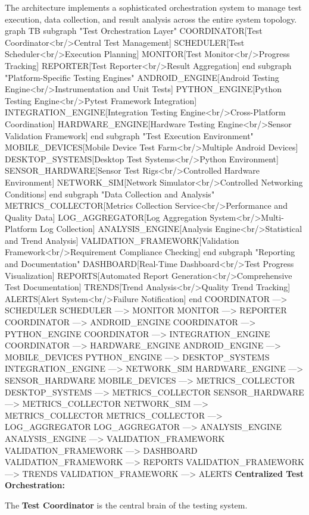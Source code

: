 {{{The architecture implements a sophisticated orchestration system to manage test execution, data collection, and result analysis across the entire system topology. graph TB subgraph "Test Orchestration Layer" COORDINATOR[Test Coordinator<br/>Central Test Management] SCHEDULER[Test Scheduler<br/>Execution Planning] MONITOR[Test Monitor<br/>Progress Tracking] REPORTER[Test Reporter<br/>Result Aggregation] end subgraph "Platform-Specific Testing Engines" ANDROID\_ENGINE[Android Testing Engine<br/>Instrumentation and Unit Tests] PYTHON\_ENGINE[Python Testing Engine<br/>Pytest Framework Integration] INTEGRATION\_ENGINE[Integration Testing Engine<br/>Cross-Platform Coordination] HARDWARE\_ENGINE[Hardware Testing Engine<br/>Sensor Validation Framework] end subgraph "Test Execution Environment" MOBILE\_DEVICES[Mobile Device Test Farm<br/>Multiple Android Devices] DESKTOP\_SYSTEMS[Desktop Test Systems<br/>Python Environment] SENSOR\_HARDWARE[Sensor Test Rigs<br/>Controlled Hardware Environment] NETWORK\_SIM[Network Simulator<br/>Controlled Networking Conditions] end subgraph "Data Collection and Analysis" METRICS\_COLLECTOR[Metrics Collection Service<br/>Performance and Quality Data] LOG\_AGGREGATOR[Log Aggregation System<br/>Multi-Platform Log Collection] ANALYSIS\_ENGINE[Analysis Engine<br/>Statistical and Trend Analysis] VALIDATION\_FRAMEWORK[Validation Framework<br/>Requirement Compliance Checking] end subgraph "Reporting and Documentation" DASHBOARD[Real-Time Dashboard<br/>Test Progress Visualization] REPORTS[Automated Report Generation<br/>Comprehensive Test Documentation] TRENDS[Trend Analysis<br/>Quality Trend Tracking] ALERTS[Alert System<br/>Failure Notification] end COORDINATOR ---> SCHEDULER SCHEDULER ---> MONITOR MONITOR ---> REPORTER COORDINATOR ---> ANDROID\_ENGINE COORDINATOR ---> PYTHON\_ENGINE COORDINATOR ---> INTEGRATION\_ENGINE COORDINATOR ---> HARDWARE\_ENGINE ANDROID\_ENGINE ---> MOBILE\_DEVICES PYTHON\_ENGINE ---> DESKTOP\_SYSTEMS INTEGRATION\_ENGINE ---> NETWORK\_SIM HARDWARE\_ENGINE ---> SENSOR\_HARDWARE MOBILE\_DEVICES ---> METRICS\_COLLECTOR DESKTOP\_SYSTEMS ---> METRICS\_COLLECTOR SENSOR\_HARDWARE ---> METRICS\_COLLECTOR NETWORK\_SIM ---> METRICS\_COLLECTOR METRICS\_COLLECTOR ---> LOG\_AGGREGATOR LOG\_AGGREGATOR ---> ANALYSIS\_ENGINE ANALYSIS\_ENGINE ---> VALIDATION\_FRAMEWORK VALIDATION\_FRAMEWORK ---> DASHBOARD VALIDATION\_FRAMEWORK ---> REPORTS VALIDATION\_FRAMEWORK ---> TRENDS VALIDATION\_FRAMEWORK ---> ALERTS \textbf{Centralized Test Orchestration:}

The \textbf{Test Coordinator}
 is the central brain of the testing system.

}}}
